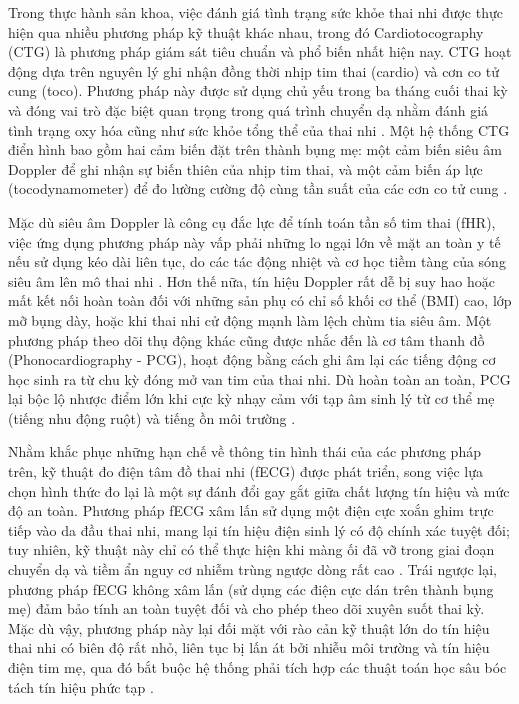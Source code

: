 \documentclass[../DoAn.tex]{subfiles}
\begin{document}
Trong thực hành sản khoa, việc đánh giá tình trạng sức khỏe thai nhi được thực hiện qua nhiều phương pháp kỹ thuật khác nhau, trong đó Cardiotocography (CTG) là phương pháp giám sát tiêu chuẩn và phổ biến nhất hiện nay. CTG hoạt động dựa trên nguyên lý ghi nhận đồng thời nhịp tim thai (cardio) và cơn co tử cung (toco). Phương pháp này được sử dụng chủ yếu trong ba tháng cuối thai kỳ và đóng vai trò đặc biệt quan trọng trong quá trình chuyển dạ nhằm đánh giá tình trạng oxy hóa cũng như sức khỏe tổng thể của thai nhi \cite{ayres-de-camposFIGOConsensusGuidelines2015}. Một hệ thống CTG điển hình bao gồm hai cảm biến đặt trên thành bụng mẹ: một cảm biến siêu âm Doppler để ghi nhận sự biến thiên của nhịp tim thai, và một cảm biến áp lực (tocodynamometer) để đo lường cường độ cùng tần suất của các cơn co tử cung \cite{freemanFetalHeartRate2012}.

Mặc dù siêu âm Doppler là công cụ đắc lực để tính toán tần số tim thai (fHR), việc ứng dụng phương pháp này vấp phải những lo ngại lớn về mặt an toàn y tế nếu sử dụng kéo dài liên tục, do các tác động nhiệt và cơ học tiềm tàng của sóng siêu âm lên mô thai nhi \cite{abramowiczFetalThermalEffects2008}. Hơn thế nữa, tín hiệu Doppler rất dễ bị suy hao hoặc mất kết nối hoàn toàn đối với những sản phụ có chỉ số khối cơ thể (BMI) cao, lớp mỡ bụng dày, hoặc khi thai nhi cử động mạnh làm lệch chùm tia siêu âm. Một phương pháp theo dõi thụ động khác cũng được nhắc đến là cơ tâm thanh đồ (Phonocardiography - PCG), hoạt động bằng cách ghi âm lại các tiếng động cơ học sinh ra từ chu kỳ đóng mở van tim của thai nhi. Dù hoàn toàn an toàn, PCG lại bộc lộ nhược điểm lớn khi cực kỳ nhạy cảm với tạp âm sinh lý từ cơ thể mẹ (tiếng nhu động ruột) và tiếng ồn môi trường \cite{kovacsRulebasedPhonocardiographicMethod2000}.

Nhằm khắc phục những hạn chế về thông tin hình thái của các phương pháp trên, kỹ thuật đo điện tâm đồ thai nhi (fECG) được phát triển, song việc lựa chọn hình thức đo lại là một sự đánh đổi gay gắt giữa chất lượng tín hiệu và mức độ an toàn. Phương pháp fECG xâm lấn sử dụng một điện cực xoắn ghim trực tiếp vào da đầu thai nhi, mang lại tín hiệu điện sinh lý có độ chính xác tuyệt đối; tuy nhiên, kỹ thuật này chỉ có thể thực hiện khi màng ối đã vỡ trong giai đoạn chuyển dạ và tiềm ẩn nguy cơ nhiễm trùng ngược dòng rất cao \cite{neilsonFetalElectrocardiogramECG2015}. Trái ngược lại, phương pháp fECG không xâm lấn (sử dụng các điện cực dán trên thành bụng mẹ) đảm bảo tính an toàn tuyệt đối và cho phép theo dõi xuyên suốt thai kỳ. Mặc dù vậy, phương pháp này lại đối mặt với rào cản kỹ thuật lớn do tín hiệu thai nhi có biên độ rất nhỏ, liên tục bị lấn át bởi nhiễu môi trường và tín hiệu điện tim mẹ, qua đó bắt buộc hệ thống phải tích hợp các thuật toán học sâu bóc tách tín hiệu phức tạp \cite{sameniReviewFetalECG2010}.
\end{document}

